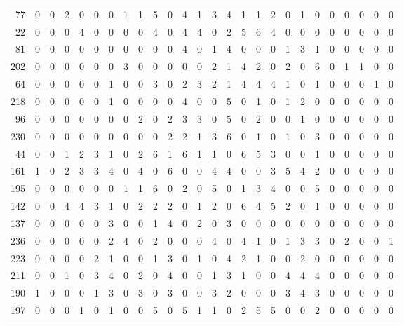 \begin{longtable}{@{\extracolsep{\fill}}rccccccccccccccccccccccccc@{}}
77 & 0 & 0 & 2 & 0 & 0 & 0 & 1 & 1 & 5 & 0 & 4 & 1 & 3 & 4 & 1 & 1 & 2 & 0 & 1 & 0 & 0 & 0 & 0 & 0 & 0 \\
22 & 0 & 0 & 0 & 4 & 0 & 0 & 0 & 0 & 4 & 0 & 4 & 4 & 0 & 2 & 5 & 6 & 4 & 0 & 0 & 0 & 0 & 0 & 0 & 0 & 0 \\
81 & 0 & 0 & 0 & 0 & 0 & 0 & 0 & 0 & 0 & 0 & 4 & 0 & 1 & 4 & 0 & 0 & 0 & 1 & 3 & 1 & 0 & 0 & 0 & 0 & 0 \\
202 & 0 & 0 & 0 & 0 & 0 & 0 & 3 & 0 & 0 & 0 & 0 & 0 & 2 & 1 & 4 & 2 & 0 & 2 & 0 & 6 & 0 & 1 & 1 & 0 & 0 \\
64 & 0 & 0 & 0 & 0 & 0 & 1 & 0 & 0 & 3 & 0 & 2 & 3 & 2 & 1 & 4 & 4 & 4 & 1 & 0 & 1 & 0 & 0 & 0 & 1 & 0 \\
218 & 0 & 0 & 0 & 0 & 0 & 1 & 0 & 0 & 0 & 0 & 4 & 0 & 0 & 5 & 0 & 1 & 0 & 1 & 2 & 0 & 0 & 0 & 0 & 0 & 0 \\
96 & 0 & 0 & 0 & 0 & 0 & 0 & 0 & 2 & 0 & 2 & 3 & 3 & 0 & 5 & 0 & 2 & 0 & 0 & 1 & 0 & 0 & 0 & 0 & 0 & 0 \\
230 & 0 & 0 & 0 & 0 & 0 & 0 & 0 & 0 & 0 & 2 & 2 & 1 & 3 & 6 & 0 & 1 & 0 & 1 & 0 & 3 & 0 & 0 & 0 & 0 & 0 \\
44 & 0 & 0 & 1 & 2 & 3 & 1 & 0 & 2 & 6 & 1 & 6 & 1 & 1 & 0 & 6 & 5 & 3 & 0 & 0 & 1 & 0 & 0 & 0 & 0 & 0 \\
161 & 1 & 0 & 2 & 3 & 3 & 4 & 0 & 4 & 0 & 6 & 0 & 0 & 4 & 4 & 0 & 0 & 3 & 5 & 4 & 2 & 0 & 0 & 0 & 0 & 0 \\
195 & 0 & 0 & 0 & 0 & 0 & 0 & 1 & 1 & 6 & 0 & 2 & 0 & 5 & 0 & 1 & 3 & 4 & 0 & 0 & 5 & 0 & 0 & 0 & 0 & 0 \\
142 & 0 & 0 & 4 & 4 & 3 & 1 & 0 & 2 & 2 & 2 & 0 & 1 & 2 & 0 & 6 & 4 & 5 & 2 & 0 & 1 & 0 & 0 & 0 & 0 & 0 \\
137 & 0 & 0 & 0 & 0 & 0 & 3 & 0 & 0 & 1 & 4 & 0 & 2 & 0 & 3 & 0 & 0 & 0 & 0 & 0 & 0 & 0 & 0 & 0 & 0 & 0 \\
236 & 0 & 0 & 0 & 0 & 0 & 2 & 4 & 0 & 2 & 0 & 0 & 0 & 4 & 0 & 4 & 1 & 0 & 1 & 3 & 3 & 0 & 2 & 0 & 0 & 1 \\
223 & 0 & 0 & 0 & 0 & 2 & 1 & 0 & 0 & 1 & 3 & 0 & 1 & 0 & 4 & 2 & 1 & 0 & 0 & 2 & 0 & 0 & 0 & 0 & 0 & 0 \\
211 & 0 & 0 & 1 & 0 & 3 & 4 & 0 & 2 & 0 & 4 & 0 & 0 & 1 & 3 & 1 & 0 & 0 & 4 & 4 & 4 & 0 & 0 & 0 & 0 & 0 \\
190 & 1 & 0 & 0 & 0 & 1 & 3 & 0 & 3 & 0 & 3 & 0 & 0 & 3 & 2 & 0 & 0 & 0 & 3 & 4 & 3 & 0 & 0 & 0 & 0 & 0 \\
197 & 0 & 0 & 0 & 1 & 0 & 1 & 0 & 0 & 5 & 0 & 5 & 1 & 1 & 0 & 2 & 5 & 5 & 0 & 0 & 2 & 0 & 0 & 0 & 0 & 0 \\

\end{longtable}
